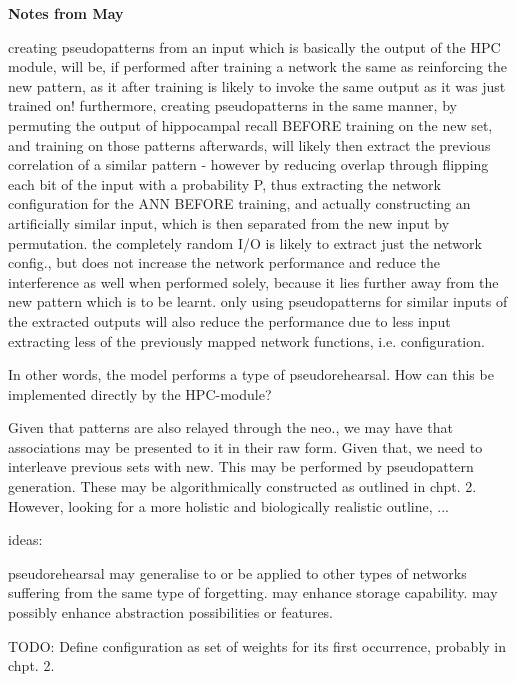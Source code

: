 \textbf{Notes from May}

creating pseudopatterns from an input which is basically the output of the HPC module, will be, if performed after training a network the same as reinforcing the new pattern, as it after training is likely to invoke the same output as it was just trained on!
furthermore, creating pseudopatterns in the same manner, by permuting the output of hippocampal recall BEFORE training on the new set, and training on those patterns afterwards, will likely then extract the previous correlation of a similar pattern - however by reducing overlap through flipping each bit of the input with a probability P, thus extracting the network configuration for the ANN BEFORE training, and actually constructing an artificially similar input, which is then separated from the new input by permutation. the completely random I/O is likely to extract just the network config., but does not increase the network performance and reduce the interference as well when performed solely, because it lies further away from the new pattern which is to be learnt. only using pseudopatterns for similar inputs of the extracted outputs will also reduce the performance due to less input extracting less of the previously mapped network functions, i.e. configuration.

In other words, the model performs a type of pseudorehearsal. How can this be implemented directly by the HPC-module?

Given that patterns are also relayed through the neo., we may have that associations may be presented to it in their raw form. Given that, we need to interleave previous sets with new. This may be performed by pseudopattern generation. These may be algorithmically constructed as outlined in chpt. 2. However, looking for a more holistic and biologically realistic outline, ...

ideas: 

pseudorehearsal may generalise to or be applied to other types of networks suffering from the same type of forgetting. may enhance storage capability. may possibly enhance abstraction possibilities or features.

TODO: Define configuration as set of weights for its first occurrence, probably in chpt. 2.

